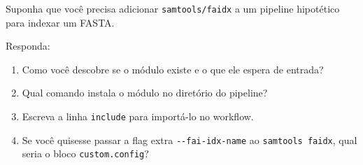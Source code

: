 \documentclass[
  brazilian,
  letterpaper,
  DIV=11,
  numbers=noendperiod]{scrreprt}
\providecommand{\tightlist}{%
  \setlength{\itemsep}{0pt}\setlength{\parskip}{0pt}}
\begin{document}
\begin{tcolorbox}[enhanced jigsaw, arc=.35mm, bottomrule=.15mm, bottomtitle=1mm, breakable, colback=white, colbacktitle=quarto-callout-note-color!10!white, colframe=quarto-callout-note-color-frame, coltitle=black, left=2mm, leftrule=.75mm, opacityback=0, opacitybacktitle=0.6, rightrule=.15mm, title=\textcolor{quarto-callout-note-color}{\faInfo}\hspace{0.5em}{Enunciado}, titlerule=0mm, toprule=.15mm, toptitle=1mm]

Suponha que você precisa adicionar \texttt{samtools/faidx} a um pipeline
hipotético para indexar um FASTA.

Responda:

\begin{enumerate}
\def\labelenumi{\alph{enumi})}
\tightlist
\item
  Como você descobre se o módulo existe e o que ele espera de entrada?
\item
  Qual comando instala o módulo no diretório do pipeline?
\item
  Escreva a linha \texttt{include} para importá-lo no workflow.
\item
  Se você quisesse passar a flag extra \texttt{-\/-fai-idx-name} ao
  \texttt{samtools\ faidx}, qual seria o bloco \texttt{custom.config}?
\end{enumerate}

\end{tcolorbox}
\end{document}
